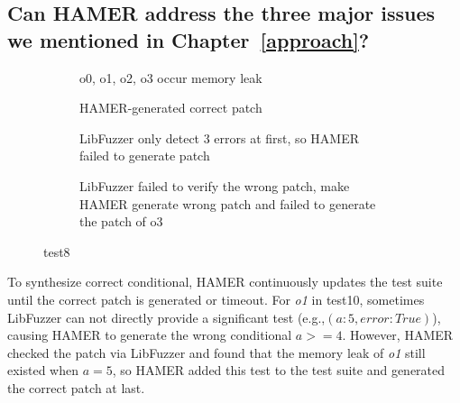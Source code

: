 \documentclass[a4paper,11pt,oneside,openany]{book}
\begin{document}
\vspace{0.4cm}
\hspace{-0.7cm}


\subsection[Research Question 2]{Can HAMER address the three major issues we mentioned in Chapter~\ref{approach}? }

\begin{figure*}[t]
  \begin{subfigure}{0.5\textwidth}
    
    \caption{o0, o1, o2, o3 occur memory leak}
    \label{test8a}
  \end{subfigure}\hfill
  \begin{subfigure}{0.4\textwidth}
    
    \caption{HAMER-generated correct patch}
    \label{test8b}
  \end{subfigure}
  \begin{subfigure}{0.5\textwidth}
    
    \caption{LibFuzzer only detect 3 errors at first, so HAMER failed to generate patch}
    \label{test8c}
  \end{subfigure}\hfill
  \begin{subfigure}{0.4\textwidth}
    
    \caption{LibFuzzer failed to verify the wrong patch, make HAMER generate wrong patch and failed to generate the patch of o3}
    \label{test8d}
  \end{subfigure}
  \caption{test8} 
  \label{test8}
\end{figure*}


To synthesize correct conditional, HAMER continuously updates the test suite until the correct patch is generated or timeout. For {\it o1} in test10, sometimes LibFuzzer can not directly provide a significant test (e.g.,$(a: 5, error: True)$),  causing HAMER to generate the wrong conditional $a>=4$. However, HAMER checked the patch via LibFuzzer and found that the memory leak of {\it o1} still existed when $a=5$, so HAMER added this test to the test suite and generated the correct patch at last.
\end{document}
